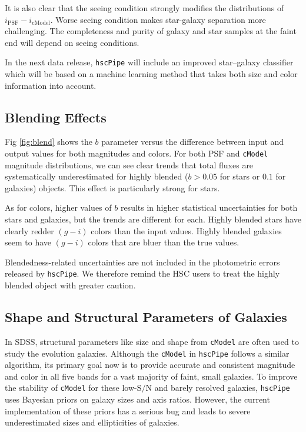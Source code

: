 \documentclass[useamsfonts]{pasj01}
\def\hscpipe{\texttt{hscPipe}}
\def\cmodel{\texttt{cModel}}
\def\s2n{{$\mathrm{S}/\mathrm{N}$}}
\begin{document}
    It is also clear that the seeing condition strongly modifies the distributions
    of $i_{\mathrm{PSF}}-i_{\mathrm{cModel}}$. 
    Worse seeing condition makes star-galaxy separation more challenging. 
    The completeness and purity of galaxy and star samples at the faint end will 
    depend on seeing conditions.  

    In the next data release, \hscpipe{} will include an improved star--galaxy 
    classifier which will be based on a machine learning method that takes both 
    size and color information into account. 

\subsection{Blending Effects}
    \label{ssec:blendedness}

    Fig \ref{fig:blend} shows the $b$ parameter versus the difference between input and
    output values for both magnitudes and colors. 
    For both PSF and \cmodel{} magnitude distributions, we can see clear trends that 
    total fluxes are systematically underestimated for highly blended ($b>0.05$ for 
    stars or $0.1$ for galaxies) objects.
    This effect is particularly strong for stars.
    
    As for colors, higher values of $b$ results in higher statistical uncertainties 
    for both stars and galaxies, but the trends are different for each.
    Highly blended stars have clearly redder $(g-i)$ colors than the input values. 
    Highly blended galaxies seem to have $(g-i)$ colors that are bluer than the 
    true values.

    Blendedness-related uncertainties are not included in the photometric errors 
    released by \hscpipe{}.
    We therefore remind the HSC users to treat the highly blended object with
    greater caution.

\subsection{Shape and Structural Parameters of Galaxies}
    \label{ssec:shape}

    In SDSS, structural parameters like size and shape from \cmodel{} are often used to 
    study the evolution galaxies.
    Although the \cmodel{} in \hscpipe{} follows a similar algorithm, its primary
    goal now is to provide accurate and consistent magnitude and color in all five
    bands for a vast majority of faint, small galaxies.
    To improve the stability of \cmodel{} for these low-\s2n{} and barely resolved
    galaxies, \hscpipe{} uses Bayesian priors on galaxy sizes and axis ratios. 
    However, the current implementation of these priors has a serious bug and leads 
    to severe underestimated sizes and ellipticities of galaxies.
    
\end{document}
